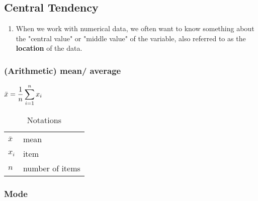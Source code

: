 \subsection{Central Tendency \cite{statistics/book/Statistics-for-Data-Scientists/Maurits-Kaptein}}\label{Data/Describing Data/Central Tendency}

\begin{enumerate}
     \item When we work with numerical data, we often want to know something about the "central value" or "middle value" of the variable, also referred to as the \textbf{location}\label{Data/Describing Data/Central Tendency/location} of the data. \cite{statistics/book/Statistics-for-Data-Scientists/Maurits-Kaptein}
\end{enumerate}


\subsubsection{(Arithmetic) mean/ average \cite{statistics/book/Statistics-for-Data-Scientists/Maurits-Kaptein}} \label{Data/Describing Data/Central Tendency/(Arithmetic) mean or average}

\begin{table}[H]
    \begin{minipage}{0.3\linewidth}
        $
            \bar{x} = \dfrac{1}{n} \displaystyle\sum_{i=1}^{n} x_i
        $
    \end{minipage}
    \begin{minipage}{0.65\linewidth}
        \begin{table}[H]
            \begin{tabular}{l l}
                $\bar{x}$ & mean \\
                $x_i$ & item \\
                $n$ & number of items \\
            \end{tabular}
            \caption*{Notations}
        \end{table}
    \end{minipage}
\end{table}



\subsubsection{Mode \cite{statistics/book/Statistics-for-Data-Scientists/Maurits-Kaptein}} \label{Data/Describing Data/Central Tendency/Mode}

